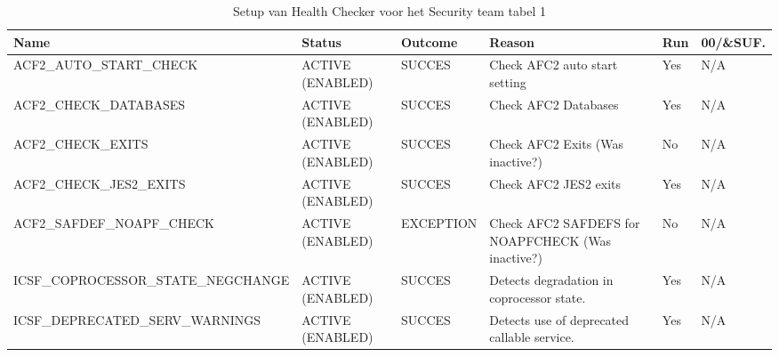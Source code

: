 \begin{landscape}
	\begin{table}[h]
		\begin{tabular}{|l|p{2.3cm}|l|p{4.5cm}|l|l|}
			\hline
			\textbf{Name}                       & \textbf{Status}   & \textbf{Outcome} & \textbf{Reason}    & \textbf{Run} &	\textbf{00/\&SUF.} \\ \hline
			ACF2\_AUTO\_START\_CHECK            & ACTIVE (ENABLED) & SUCCES    & Check   AFC2 auto start setting                     & Yes & N/A \\ \hline
			ACF2\_CHECK\_DATABASES              & ACTIVE (ENABLED) & SUCCES    & Check   AFC2 Databases                              & Yes & N/A \\ \hline
			ACF2\_CHECK\_EXITS                  & ACTIVE (ENABLED) & SUCCES    & Check   AFC2 Exits (Was inactive?)                  & No  & N/A \\ \hline
			ACF2\_CHECK\_JES2\_EXITS            & ACTIVE (ENABLED) & SUCCES    & Check   AFC2 JES2 exits                             & Yes & N/A \\ \hline
			ACF2\_SAFDEF\_NOAPF\_CHECK          & ACTIVE (ENABLED) & EXCEPTION & Check   AFC2 SAFDEFS for NOAPFCHECK (Was inactive?) & No  & N/A \\ \hline
			ICSF\_COPROCESSOR\_STATE\_NEGCHANGE & ACTIVE (ENABLED) & SUCCES    & Detects   degradation in coprocessor state.         & Yes & N/A \\ \hline
			ICSF\_DEPRECATED\_SERV\_WARNINGS    & ACTIVE (ENABLED) & SUCCES    & Detects   use of deprecated callable service.       & Yes & N/A \\ \hline
		\end{tabular}
		\caption[Health Checker Security team tabel 1]{Setup van Health Checker voor het Security team tabel 1}
		\label{tbl:Security Team Tabel 1}
	\end{table}
\end{landscape}

